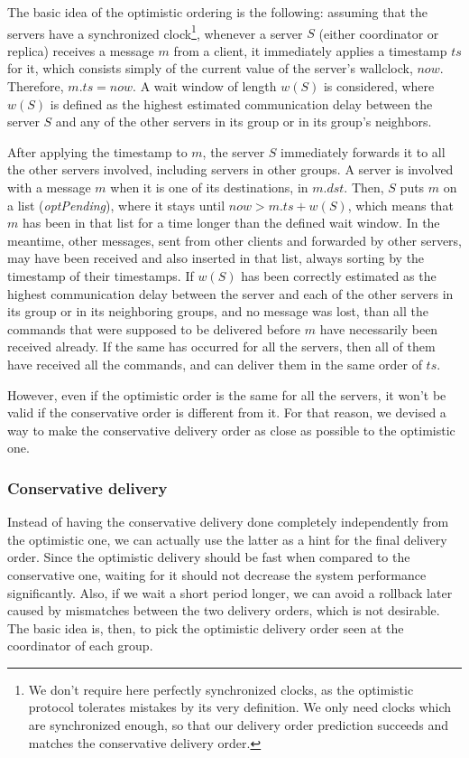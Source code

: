 \documentclass[times, 10pt]{article}
\begin{document}
The basic idea of the optimistic ordering is the following: assuming that the servers have a synchronized clock\footnote{We don't require here perfectly synchronized clocks, as the optimistic protocol tolerates mistakes by its very definition. We only need clocks which are synchronized enough, so that our delivery order prediction succeeds and matches the conservative delivery order.}, whenever a server $S$ (either coordinator or replica) receives a message $m$ from a client, it immediately applies a timestamp $ts$ for it, which consists simply of the current value of the server's wallclock, $now$. Therefore, $m.ts=now$. A wait window of length $w(S)$ is considered, where $w(S)$ is defined as the highest estimated communication delay between the server $S$ and any of the other servers in its group or in its group's neighbors.

After applying the timestamp to $m$, the server $S$ immediately forwards it to all the other servers involved, including servers in other groups. A server is involved with a message $m$ when it is one of its destinations, in $m.dst$. Then, $S$ puts $m$ on a list (\mbox{\textit{optPending}}), where it stays until $now>m.ts+w(S)$, which means that $m$ has been in that list for a time longer than the defined wait window. In the meantime, other messages, sent from other clients and forwarded by other servers, may have been received and also inserted in that list, always sorting by the timestamp of their timestamps. If $w(S)$ has been correctly estimated as the highest communication delay between the server and each of the other servers in its group or in its neighboring groups, and no message was lost, than all the commands that were supposed to be delivered before $m$ have necessarily been received already. If the same has occurred for all the servers, then all of them have received all the commands, and can deliver them in the same order of $ts$.

However, even if the optimistic order is the same for all the servers, it won't be valid if the conservative order is different from it. For that reason, we devised a way to make the conservative delivery order as close as possible to the optimistic one.

\subsubsection{Conservative delivery}

Instead of having the conservative delivery done completely independently from the optimistic one, we can actually use the latter as a hint for the final delivery order. Since the optimistic delivery should be fast when compared to the conservative one, waiting for it should not decrease the system performance significantly. Also, if we wait a short period longer, we can avoid a rollback later caused by mismatches between the two delivery orders, which is not desirable. The basic idea is, then, to pick the optimistic delivery order seen at the coordinator of each group.
\end{document}
